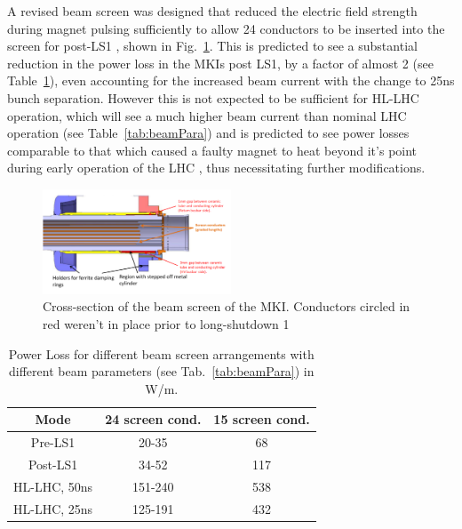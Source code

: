 \documentclass[a4paper,
              ]{jacow}
\begin{document}
A revised beam screen was designed that reduced the electric field strength during magnet pulsing sufficiently to allow 24 conductors to be inserted into the screen for post-LS1 \cite{mkiUpgrade}, shown in Fig.~\ref{fig:BeamScreenPostLS1}. This is predicted to see a substantial reduction in the power loss in the MKIs post LS1, by a factor of almost 2 (see Table~\ref{tab:PowLoss}), even accounting for the increased beam current with the change to 25ns bunch separation. However this is not expected to be sufficient for HL-LHC operation, which will see a much higher beam current than nominal LHC operation (see Table~\ref{tab:beamPara}) and is predicted to see power losses comparable to that which caused a faulty magnet to heat beyond it's point during early operation of the LHC \cite{mkiImp2014}, thus necessitating further modifications.

\begin{figure}
\begin{center}
\includegraphics[width=0.5\textwidth]{beamScreenCrossSectionLabelled.pdf}
\caption{Cross-section of the beam screen of the MKI. Conductors circled in red weren't in place prior to long-shutdown 1}
\label{fig:BeamScreenPostLS1}
\end{center}
\end{figure}

\begin{table}
\caption{Power Loss for different beam screen arrangements with different beam parameters (see Tab.~\ref{tab:beamPara}) in W/m.}
\label{tab:PowLoss}
\begin{center}
\begin{tabular}{c | c | c}
Mode & 24 screen cond. & 15 screen cond. \\ \hline 
Pre-LS1 & 20-35 & 68 \\ \hline 
Post-LS1 & 34-52 & 117 \\ \hline 
HL-LHC, 50ns & 151-240 & 538  \\ \hline 
HL-LHC, 25ns & 125-191 & 432  \\ 
\end{tabular}
\end{center}
\end{table}
\end{document}
